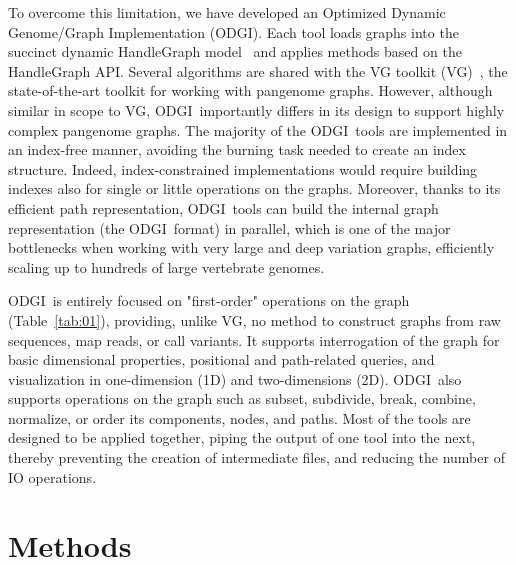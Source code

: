 \documentclass{bioinfo}
\newcommand{\odgi}{ODGI}
\begin{document}
    To overcome this limitation, we have developed an Optimized Dynamic Genome/Graph Implementation (ODGI). Each tool
    loads graphs into the succinct dynamic HandleGraph model~\citep{33040146} and applies methods based on the
    HandleGraph API. Several algorithms are shared with the VG toolkit (VG)~\citep{30125266}, the state-of-the-art
    toolkit for working with pangenome graphs. However, although similar in scope to VG, \odgi\ importantly differs in
    its design to support highly complex pangenome graphs. The majority of the \odgi\ tools are implemented in an
    index-free manner, avoiding the burning task needed to create an index structure. Indeed, index-constrained
    implementations would require building indexes also for single or little operations on the graphs. Moreover,
    thanks to its efficient path representation, \odgi\ tools can build the internal graph representation (the \odgi\
    format) in parallel, which is one of the major bottlenecks when working with very large and deep variation graphs,
    efficiently scaling up to hundreds of large vertebrate genomes.

    \odgi\ is entirely focused on "first-order" operations on the graph
    (Table~\ref{tab:01}), providing, unlike VG, no method to construct
    graphs from raw sequences, map reads, or call variants. It
    supports interrogation of the graph for basic dimensional
    properties, positional and path-related queries, and visualization
    in one-dimension (1D) and two-dimensions (2D). \odgi\ also supports
    operations on the graph such as subset, subdivide, break, combine,
    normalize, or order its components, nodes, and paths. Most of the
    tools are designed to be applied together, piping the output of
    one tool into the next, thereby preventing the creation of
    intermediate files, and reducing the number of IO operations.

    \section{Methods}
\end{document}
